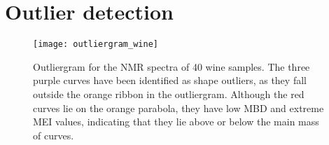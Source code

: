 \section{Outlier detection}

\begin{figure}
    \centering
    \texttt{[image: outliergram\_wine]}
    \caption{
        Outliergram for the NMR spectra of 40 wine samples.
        The three purple curves have been identified as shape outliers, as
        they fall outside the orange ribbon in the outliergram.
        Although the red curves lie on the orange parabola, they have low MBD
        and extreme MEI values, indicating that they lie above or below the
        main mass of curves.
    }
    \label{fig:outliergram_wine}
\end{figure}




